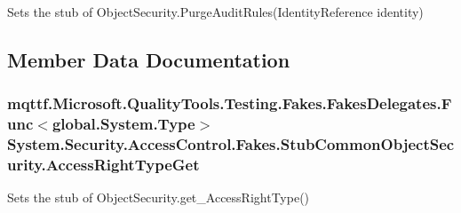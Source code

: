 Sets the stub of Object\-Security.\-Purge\-Audit\-Rules(\-Identity\-Reference identity)



\subsection{Member Data Documentation}
\hypertarget{class_system_1_1_security_1_1_access_control_1_1_fakes_1_1_stub_common_object_security_ac6982540a95e47156721d83c9d8d5ec3}{
\subsubsection[{Access\-Right\-Type\-Get}]{\setlength{\rightskip}{0pt plus 5cm}mqttf.\-Microsoft.\-Quality\-Tools.\-Testing.\-Fakes.\-Fakes\-Delegates.\-Func$<$global.\-System.\-Type$>$ System.\-Security.\-Access\-Control.\-Fakes.\-Stub\-Common\-Object\-Security.\-Access\-Right\-Type\-Get}}\label{class_system_1_1_security_1_1_access_control_1_1_fakes_1_1_stub_common_object_security_ac6982540a95e47156721d83c9d8d5ec3}


Sets the stub of Object\-Security.\-get\-\_\-\-Access\-Right\-Type()

